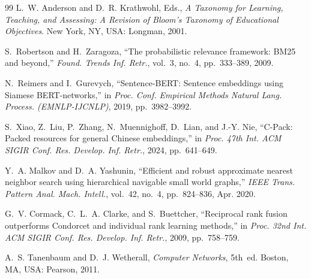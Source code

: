 \documentclass[conference]{IEEEtran}
\begin{document}
\begin{thebibliography}{99}
L.~W. Anderson and D.~R. Krathwohl, Eds., \textit{A Taxonomy for Learning,
Teaching, and Assessing: A Revision of Bloom's Taxonomy of Educational
Objectives}. New York, NY, USA: Longman, 2001.

S.~Robertson and H.~Zaragoza, ``The probabilistic relevance framework: BM25
and beyond,'' \textit{Found. Trends Inf. Retr.}, vol.~3, no.~4,
pp.~333--389, 2009.

N.~Reimers and I.~Gurevych, ``Sentence-BERT: Sentence embeddings using
Siamese BERT-networks,'' in \textit{Proc. Conf. Empirical Methods Natural
Lang. Process. (EMNLP-IJCNLP)}, 2019, pp.~3982--3992.

S.~Xiao, Z.~Liu, P.~Zhang, N.~Muennighoff, D.~Lian, and J.-Y. Nie, ``C-Pack:
Packed resources for general Chinese embeddings,'' in \textit{Proc. 47th Int.
ACM SIGIR Conf. Res. Develop. Inf. Retr.}, 2024, pp.~641--649.

Y.~A. Malkov and D.~A. Yashunin, ``Efficient and robust approximate nearest
neighbor search using hierarchical navigable small world graphs,''
\textit{IEEE Trans. Pattern Anal. Mach. Intell.}, vol.~42, no.~4,
pp.~824--836, Apr. 2020.

G.~V. Cormack, C.~L.~A. Clarke, and S.~Buettcher, ``Reciprocal rank fusion
outperforms Condorcet and individual rank learning methods,'' in
\textit{Proc. 32nd Int. ACM SIGIR Conf. Res. Develop. Inf. Retr.}, 2009,
pp.~758--759.

A.~S. Tanenbaum and D.~J. Wetherall, \textit{Computer Networks}, 5th~ed.
Boston, MA, USA: Pearson, 2011.

\end{thebibliography}
\end{document}
